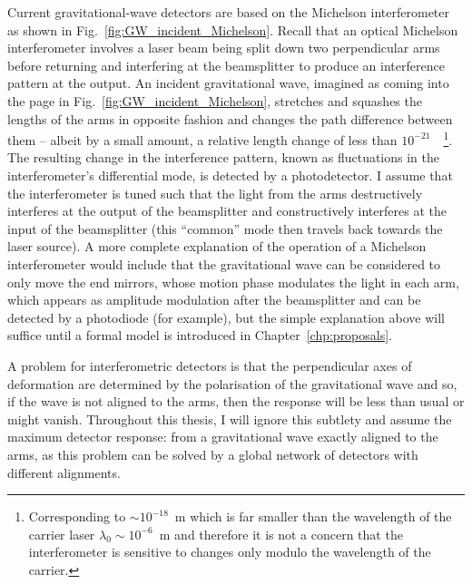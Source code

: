 Current gravitational-wave detectors are based on the Michelson interferometer as shown in Fig.~\ref{fig:GW_incident_Michelson}. Recall that an optical Michelson interferometer involves a laser beam being split down two perpendicular arms before returning and interfering at the beamsplitter to produce an interference pattern at the output. 
An incident gravitational wave, imagined as coming into the page in Fig.~\ref{fig:GW_incident_Michelson}, stretches and squashes the lengths of the arms in opposite fashion and changes the path difference between them -- albeit by a small amount, a relative length change of less than $10^{-21}$~\cite{}~\footnote{Corresponding to $\sim10^{-18}$~m which is far smaller than the wavelength of the carrier laser $\lambda_0\sim10^{-6}$~m and therefore it is not a concern that the interferometer is sensitive to changes only modulo the wavelength of the carrier.}. The resulting change in the interference pattern, known as fluctuations in the interferometer's differential mode, is detected by a photodetector. I assume that the interferometer is tuned such that the light from the arms destructively interferes at the output of the beamsplitter and constructively interferes at the input of the beamsplitter (this ``common'' mode then travels back towards the laser source).
A more complete explanation of the operation of a Michelson interferometer would include that the gravitational wave can be considered to only move the end mirrors, whose motion phase modulates the light in each arm, which appears as amplitude modulation after the beamsplitter and can be detected by a photodiode (for example), but the simple explanation above will suffice until a formal model is introduced in Chapter~\ref{chp:proposals}.  


A problem for interferometric detectors is that the perpendicular axes of deformation are determined by the polarisation of the gravitational wave and so, if the wave is not aligned to the arms, then the response will be less than usual or might vanish. Throughout this thesis, I will ignore this subtlety and assume the maximum detector response: from a gravitational wave exactly aligned to the arms, as this problem can be solved by a global network of detectors with different alignments. %

